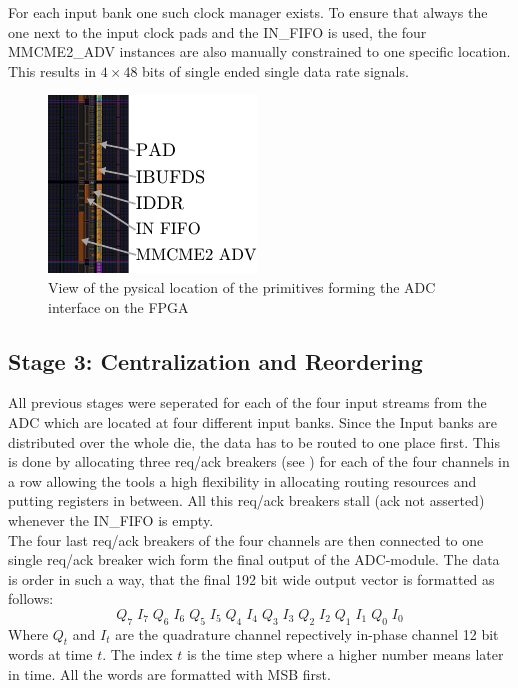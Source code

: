 For each input bank one such clock manager exists. To ensure that
always the one next to the input clock pads and the IN\_FIFO is
used, the four MMCME2\_ADV instances are also manually constrained to
one specific location. \\

This results in $4 \times 48$ bits of single ended single data rate signals.

\begin{figure}
  \centering
  \includegraphics{figures/adc_input_bank}
  \caption{View of the pysical location of the primitives forming the
    \gls{ADC} interface on the \gls{FPGA}}
  \label{fig:fpga_architecture_overview}
\end{figure}

\subsection{Stage 3: Centralization and Reordering}
\label{sec:fpga_adc_s3}
All previous stages were seperated for each of the four input streams
from the \gls{ADC} which are located at four different input banks.
Since the Input banks are distributed over the whole die, the data
has to be routed to one place first. This is done by allocating
three req/ack breakers (see )
for each of the four channels in a row allowing the tools a high flexibility
in allocating routing resources and putting registers in between.
All this req/ack breakers stall (ack not asserted) whenever the IN\_FIFO
is empty. \\

The four last req/ack breakers of the four channels are then connected
to one single req/ack breaker wich form the final output of the
\gls{ADC}-module. The data is order in such a way, that the final 192 bit
wide output vector is formatted as follows:
\[Q_7\;I_7\;Q_6\;I_6\;Q_5\;I_5\;Q_4\;I_4\;Q_3\;I_3\;Q_2\;I_2\;Q_1\;I_1\;Q_0\;I_0\]
Where $Q_t$ and $I_t$ are the quadrature channel repectively in-phase channel
12 bit words at time $t$.
The index $t$ is the time step where a higher number means later in time.
All the words are formatted with \gls{MSB} first.

